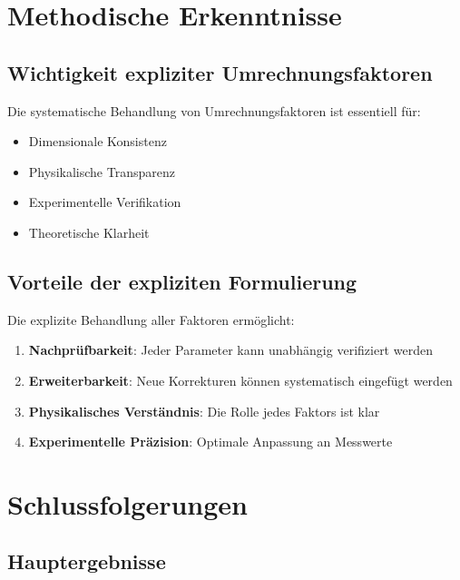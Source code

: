 \documentclass[12pt,a4paper]{article}
\begin{document}
	\section{Methodische Erkenntnisse}
	
	\subsection{Wichtigkeit expliziter Umrechnungsfaktoren}
	
	\begin{keyresult}
		Die systematische Behandlung von Umrechnungsfaktoren ist essentiell für:
		\begin{itemize}
			\item Dimensionale Konsistenz
			\item Physikalische Transparenz
			\item Experimentelle Verifikation
			\item Theoretische Klarheit
		\end{itemize}
	\end{keyresult}
	
	\subsection{Vorteile der expliziten Formulierung}
	
	Die explizite Behandlung aller Faktoren ermöglicht:
	
	\begin{enumerate}
		\item \textbf{Nachprüfbarkeit}: Jeder Parameter kann unabhängig verifiziert werden
		\item \textbf{Erweiterbarkeit}: Neue Korrekturen können systematisch eingefügt werden
		\item \textbf{Physikalisches Verständnis}: Die Rolle jedes Faktors ist klar
		\item \textbf{Experimentelle Präzision}: Optimale Anpassung an Messwerte
	\end{enumerate}
	
	\section{Schlussfolgerungen}
	
	\subsection{Hauptergebnisse}
	
\end{document}
